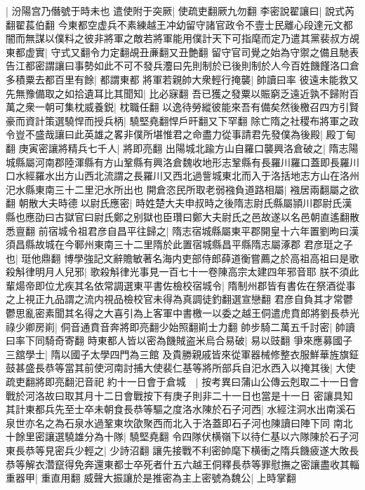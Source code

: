 |{
	汾陽宫乃僭號于時未也}
遣使附于突厥|{
	使疏吏翻厥九勿翻}
李密說翟讓曰|{
	說式芮翻翟萇伯翻}
今東都空虚兵不素練越王冲幼留守諸官政令不壹士民離心段達元文都闇而無謀以僕料之彼非將軍之敵若將軍能用僕計天下可指麾而定乃遣其黨裴叔方覘東都虚實|{
	守式又翻令力定翻覘丑亷翻又丑艶翻}
留守官司覺之始為守禦之備且馳表告江都密謂讓曰事勢如此不可不發兵灋曰先則制於已後則制於人今百姓饑饉洛口倉多積粟去都百里有餘|{
	都謂東都}
將軍若親帥大衆輕行掩襲|{
	帥讀曰率}
彼遠未能救又先無豫備取之如拾遺耳比其聞知|{
	比必寐翻}
吾已獲之發粟以賑窮乏遠近孰不歸附百萬之衆一朝可集枕威養鋭|{
	枕職任翻}
以逸待勞縱彼能來吾有備矣然後檄召四方引賢豪而資計策選驍悍而授兵柄|{
	驍堅堯翻悍戶旰翻又下罕翻}
除亡隋之社稷布將軍之政令豈不盛哉讓曰此英雄之畧非僕所堪惟君之命盡力從事請君先發僕為後殿|{
	殿丁甸翻}
庚寅密讓將精兵七千人|{
	將即亮翻}
出陽城北踰方山自羅口襲興洛倉破之|{
	隋志陽城縣屬河南郡陸渾縣有方山鞏縣有興洛倉魏收地形志鞏縣有長羅川羅口蓋即長羅川口水經羅水出方山西北流謂之長羅川又西北過訾城東北而入于洛括地志方山在洛州汜水縣東南三十二里汜水所出也}
開倉恣民所取老弱襁負道路相屬|{
	襁居兩翻屬之欲翻}
朝散大夫時德以尉氏應密|{
	時姓楚大夫申叔時之後隋志尉氏縣屬頴川郡尉氏漢縣也應劭曰古獄官曰尉氏鄭之别獄也臣瓚曰鄭大夫尉氏之邑故遂以名邑朝直遙翻散悉亶翻}
前宿城令祖君彦自昌平往歸之|{
	隋志宿城縣屬東平郡開皇十六年置劉昫曰漢須昌縣故城在今鄆州東南三十二里隋於此置宿城縣昌平縣隋志屬涿郡}
君彦珽之子也|{
	珽他鼎翻}
博學強記文辭贍敏著名海内吏部侍郎薛道衡嘗薦之於高祖高祖曰是歌殺斛律明月人兒邪|{
	歌殺斛律光事見一百七十一卷陳高宗太建四年邪音耶}
朕不須此輩煬帝即位尤疾其名依常調選東平書佐檢校宿城令|{
	隋制州郡皆有書佐在祭酒從事之上視正九品謂之流内視品檢校官未得為真調徒釣翻選宣戀翻}
君彦自負其才常鬱鬱思亂密素聞其名得之大喜引為上客軍中書檄一以委之越王侗遣虎賁郎將劉長恭光祿少卿房崱|{
	侗音通賁音奔將即亮翻少始照翻崱士力翻}
帥步騎二萬五千討密|{
	帥讀曰率下同騎奇寄翻}
時東都人皆以密為饑賊盗米烏合易破|{
	易以豉翻}
爭來應募國子三舘學士|{
	隋以國子太學四門為三館}
及貴勝親戚皆來從軍器械修整衣服鮮華旌旗鉦鼓甚盛長恭等當其前使河南討捕大使裴仁基等將所部兵自汜水西入以掩其後|{
	大使疏吏翻將即亮翻汜音祀}
約十一日會于倉城　|{
	按考異曰蒲山公傳云剋取二十一日會戰於河洛故曰取其月十二日會戰按下有庚子則非二十一日也當是十一日}
密讓具知其計東都兵先至士卒未朝食長恭等驅之度洛水陳於石子河西|{
	水經注洞水出南溪石泉世亦名之為石泉水過鞏東坎欿聚西而北入于洛蓋即石子河也陳讀曰陣下同}
南北十餘里密讓選驍雄分為十隊|{
	驍堅堯翻}
令四隊伏横嶺下以待仁基以六隊陳於石子河東長恭等見密兵少輕之|{
	少詩沼翻}
讓先接戰不利密帥麾下横衝之隋兵饑疲遂大敗長恭等解衣濳竄得免奔還東都士卒死者什五六越王侗釋長恭等罪慰撫之密讓盡收其輜重器甲|{
	重直用翻}
威聲大振讓於是推密為主上密號為魏公|{
	上時掌翻}
